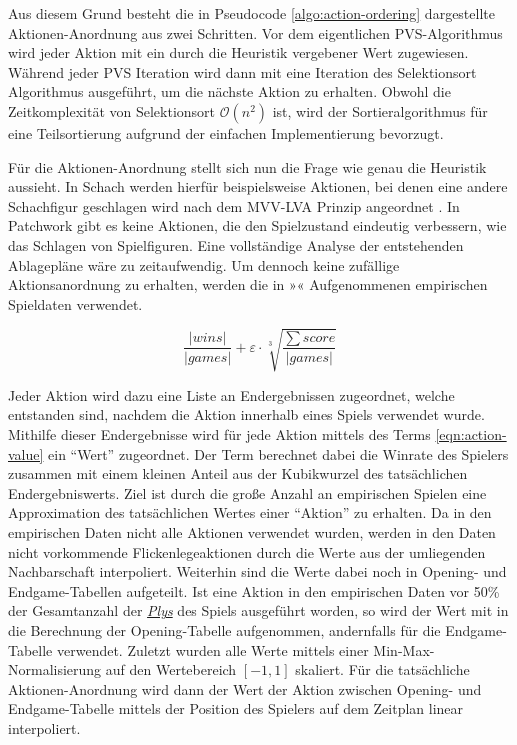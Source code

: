 Aus diesem Grund besteht die in Pseudocode \ref{algo:action-ordering} dargestellte Aktionen-Anordnung aus zwei Schritten. Vor dem eigentlichen \ac{PVS}-Algorithmus wird jeder Aktion mit  ein durch die Heuristik vergebener Wert zugewiesen. Während jeder \ac{PVS} Iteration wird dann mit  eine Iteration des Selektionsort Algorithmus ausgeführt, um die nächste Aktion zu erhalten. Obwohl die Zeitkomplexität von Selektionsort $\mathcal{O}\left(n^2\right)$ ist, wird der Sortieralgorithmus für eine Teilsortierung aufgrund der einfachen Implementierung bevorzugt.

Für die Aktionen-Anordnung stellt sich nun die Frage wie genau die Heuristik aussieht. In Schach werden hierfür beispielsweise Aktionen, bei denen eine andere Schachfigur geschlagen wird nach dem \ac{MVV-LVA} Prinzip angeordnet \cite[S. 72]{2002.FPGAMoveGenerator}. In Patchwork gibt es keine Aktionen, die den Spielzustand eindeutig verbessern, wie das Schlagen von Spielfiguren. Eine vollständige Analyse der entstehenden Ablagepläne wäre zu zeitaufwendig. Um dennoch keine zufällige Aktionsanordnung zu erhalten, werden die in »« Aufgenommenen empirischen Spieldaten verwendet.

\begin{equation}
    \label{eqn:action-value}
    \frac{|wins|}{|games|} + \varepsilon \cdot \sqrt[3]{\frac{\sum score}{|games|}}
\end{equation}

Jeder Aktion wird dazu eine Liste an Endergebnissen zugeordnet, welche entstanden sind, nachdem die Aktion innerhalb eines Spiels verwendet wurde. Mithilfe dieser Endergebnisse wird für jede Aktion mittels des Terms \ref{eqn:action-value} ein \enquote{Wert} zugeordnet. Der Term berechnet dabei die Winrate des Spielers zusammen mit einem kleinen Anteil aus der Kubikwurzel des tatsächlichen Endergebniswerts. Ziel ist durch die große Anzahl an empirischen Spielen eine Approximation des tatsächlichen Wertes einer \enquote{Aktion} zu erhalten. Da in den empirischen Daten nicht alle Aktionen verwendet wurden, werden in den Daten nicht vorkommende Flickenlegeaktionen durch die Werte aus der umliegenden Nachbarschaft interpoliert. Weiterhin sind die Werte dabei noch in Opening- und Endgame-Tabellen aufgeteilt. Ist eine Aktion in den empirischen Daten vor 50\% der Gesamtanzahl der \hyperref[text:ply]{\emph{Plys}} des Spiels ausgeführt worden, so wird der Wert mit in die Berechnung der Opening-Tabelle aufgenommen, andernfalls für die Endgame-Tabelle verwendet. Zuletzt wurden alle Werte mittels einer Min-Max-Normalisierung auf den Wertebereich $\left[-1, 1\right]$ skaliert. Für die tatsächliche Aktionen-Anordnung wird dann der Wert der Aktion zwischen Opening- und Endgame-Tabelle mittels der Position des Spielers auf dem Zeitplan linear interpoliert.

